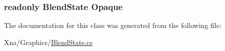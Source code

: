 \subsubsection[{Opaque}]{\setlength{\rightskip}{0pt plus 5cm}readonly {\bf Blend\+State} Opaque\hspace{0.3cm}{\ttfamily [static]}}\label{classMicrosoft_1_1Xna_1_1Framework_1_1Graphics_1_1BlendState_af8464c892cec46986d869076a0cda713}


The documentation for this class was generated from the following file\+:\begin{DoxyCompactItemize}
\item 
Xna/\+Graphics/\hyperlink{BlendState_8cs}{Blend\+State.\+cs}\end{DoxyCompactItemize}
